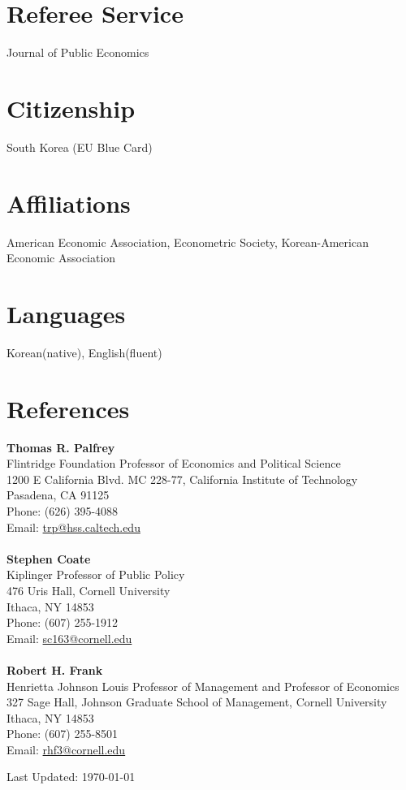 \documentclass[margin]{res}
\begin{document}
\begin{resume}

\section{Referee Service} Journal of Public Economics

\section{Citizenship} South Korea (EU Blue Card)%

\section{Affiliations} American Economic Association, Econometric Society, Korean-American Economic Association

\section{Languages} Korean(native), English(fluent)

\section{References} \textbf{Thomas R. Palfrey}\\
Flintridge Foundation Professor of Economics and Political Science\\
1200 E California Blvd. MC 228-77, California Institute of Technology\\
Pasadena, CA 91125\\
Phone: (626) 395-4088\\
Email: \href{mailto:trp@hss.caltech.edu}{trp@hss.caltech.edu}\\\\
\textbf{Stephen Coate}\\
Kiplinger Professor of Public Policy\\
476 Uris Hall, Cornell University\\
Ithaca, NY 14853\\
Phone: (607) 255-1912 \\
Email: \href{mailto:sc163@cornell.edu}{sc163@cornell.edu}\\\\
\textbf{Robert H. Frank}\\
Henrietta Johnson Louis Professor of Management and Professor of Economics\\
327 Sage Hall, Johnson Graduate School of Management, Cornell University\\
Ithaca, NY 14853\\
Phone: (607) 255-8501\\
Email: \href{mailto:rhf3@cornell.edu}{rhf3@cornell.edu}
\begin{flushright}
Last Updated: \today
\end{flushright}
\end{resume} 
\end{document}
